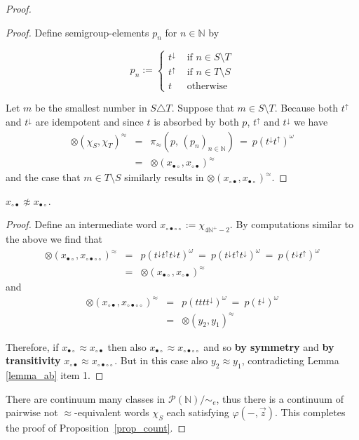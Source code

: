 \documentclass{stacs_proc}
\newcommand{\Nat}{\mathbb{N}}
\newcommand{\calP}{\mathcal{P}}
\begin{document}
\begin{proof}
\begin{proof}
Define semigroup-elements $p_n$ for $n \in \Nat$ by 
 		
\[
p_n := 
		\begin{cases}	
		t^\downarrow & \text{ if } n \in S \setminus T \\
		t^\uparrow   & \text{ if } n \in T \setminus S \\
		t	     & \text{ otherwise}
		\end{cases}
\]

Let $m$ be the smallest number in $S \triangle T$. Suppose that $m \in S \setminus T$.
Because both $t^\uparrow$ and $t^\downarrow$ are idempotent and 
since $t$ is absorbed by both $p$, $t^\uparrow$ and $t^\downarrow$ we have
\begin{eqnarray*}
\otimes(\chi_S,\chi_T)^\approx	
& = & 	\pi_\approx \left( 
		p, \, 
		(p_n)_{n \in \Nat}
		\right) 
\  = \ 	p (t^\downarrow t^\uparrow)^\omega \\
& = & 	\otimes(x_{\bullet\circ},x_{\circ\bullet})^\approx
\end{eqnarray*}
and the case that $m \in T \setminus S$ similarly results 
in $\otimes(x_{\circ\bullet},x_{\bullet\circ})^\approx$.
\end{proof}


\begin{lemma}
$x_{\circ\bullet} \not \approx x_{\bullet\circ}$. 
\end{lemma}

\begin{proof}
Define an intermediate word $x_{\circ\bullet\circ\circ}:=\chi_{4\Nat^+ - 2}$.
By computations similar to the above we find that
\begin{eqnarray*}
\otimes(x_{\bullet\circ},x_{\circ\bullet\circ\circ})^\approx	
& = & 	p (t^\downarrow t^\uparrow t^\downarrow t)^\omega 
\ = \ 	p (t^\downarrow t^\uparrow t^\downarrow)^\omega 
\ = \  	p (t^\downarrow t^\uparrow)^\omega \\
& = & 	\otimes(x_{\bullet\circ},x_{\circ\bullet})^\approx 
\end{eqnarray*}
and
\begin{eqnarray*}
\otimes(x_{\circ\bullet},x_{\circ\bullet\circ\circ})^\approx	
& = & 	p (t t t t^\downarrow)^\omega 
\ = \  	p (t^\downarrow)^\omega \\
& = & 	\otimes(y_2,y_1)^\approx 
\end{eqnarray*}

Therefore, if $x_{\bullet\circ} \approx x_{\circ\bullet}$ then 
also $x_{\bullet\circ} \approx x_{\circ\bullet\circ\circ}$ and so 
{\bf by symmetry} and {\bf by transitivity} 
$x_{\circ\bullet} \approx x_{\circ\bullet\circ\circ}$. 
But in this case also $y_2 \approx y_1$, contradicting Lemma \ref{lemma_ab} item 1. 
\end{proof}

\noindent There are continuum many classes in $\calP(\mathbb{N})/\sim_e$,
thus there is a continuum of pairwise not $\approx$-equivalent 
words $\chi_S$ each satisfying $\varphi(-,\vec{z})$.
This completes the proof of Proposition~\ref{prop_count}.
\end{proof}
\end{document}
